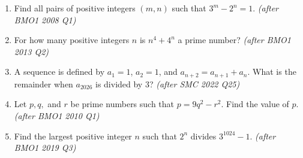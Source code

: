 \documentclass[11pt,a4paper]{article}
\begin{document}
\begin{enumerate}

\item Find all pairs of positive integers $(m, n)$ such that $3^m - 2^n = 1$. \textit{\small(after BMO1 2008 Q1)}

\item For how many positive integers $n$ is $n^4 + 4^n$ a prime number? \textit{\small(after BMO1 2013 Q2)}

\item A sequence is defined by $a_1 = 1$, $a_2 = 1$, and $a_{n+2} = a_{n+1} + a_n$. What is the remainder when $a_{2026}$ is divided by $3$? \textit{\small(after SMC 2022 Q25)}

\item Let $p, q,$ and $r$ be prime numbers such that $p = 9q^2 - r^2$. Find the value of $p$. \textit{\small(after BMO1 2010 Q1)}

\item Find the largest positive integer $n$ such that $2^n$ divides $3^{1024} - 1$. \textit{\small(after BMO1 2019 Q3)}

\end{enumerate}

\end{document}
